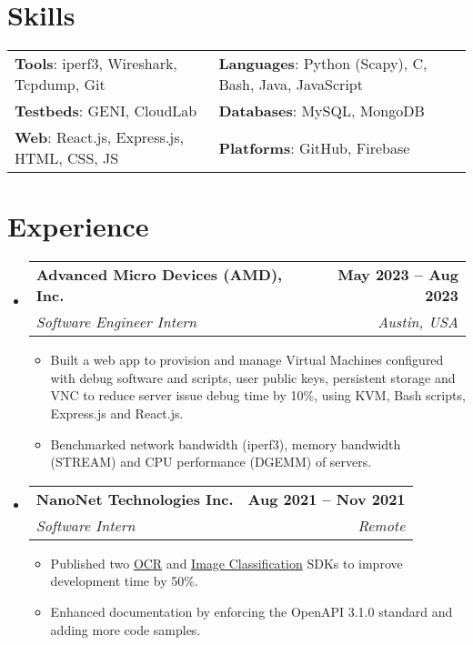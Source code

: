 \documentclass[letterpaper,11pt]{article}
\makeatletter
\newcommand{\resumeItem}[1]{
  \item\small{
    {#1 \vspace{-2pt}}
  }
}
\newcommand{\resumeSubheading}[4]{
  \vspace{-2pt}\item
    \begin{tabular*}{1.0\textwidth}[t]{l@{\extracolsep{\fill}}r}
      \vspace{-2pt}\textbf{#1} & \textbf{\small #2} \\
      \textit{\small#3} & \textit{\small #4} \\
    \end{tabular*}\vspace{-7pt}
}
\newcommand{\resumeSubHeadingListStart}{\begin{itemize}[leftmargin=0.0in, label={}]}
\newcommand{\resumeSubHeadingListEnd}{\end{itemize}}
\newcommand{\resumeItemListStart}{\begin{itemize}}
\newcommand{\resumeItemListEnd}{\end{itemize}\vspace{-5pt}}
\makeatother
\begin{document}
\section{Skills}
    \vspace{-2pt}
    \begin{itemize}[leftmargin=0.2in, label={}]
        {\item{
            \begin{tabular}{ l@{\hskip 0.2in} l }
                 \textbf{Tools}: iperf3, Wireshark, Tcpdump, Git & \textbf{Languages}: Python (Scapy), C, Bash, Java, JavaScript \\ 
                 \textbf{Testbeds}: GENI, CloudLab & \textbf{Databases}: MySQL, MongoDB \\  
                 \textbf{Web}: React.js, Express.js, HTML, CSS, JS & \textbf{Platforms}: GitHub, Firebase
            \end{tabular}
        }}
    \end{itemize}
\vspace{-20pt}


\section{Experience}
    \resumeSubHeadingListStart
        \resumeSubheading
            {Advanced Micro Devices (AMD), Inc.}{May 2023 -- Aug 2023}
            {Software Engineer Intern}{Austin, USA}
            \resumeItemListStart
                \resumeItem{Built a web app to provision and manage Virtual Machines configured with debug software and scripts, user public keys, persistent storage and VNC to reduce server issue debug time by 10\%, using KVM, Bash scripts, Express.js and React.js.}
                \resumeItem{Benchmarked network bandwidth (iperf3), memory bandwidth (STREAM) and CPU performance (DGEMM) of servers.}
            \resumeItemListEnd

        \resumeSubheading
            {NanoNet Technologies Inc.}{Aug 2021 -- Nov 2021}
            {Software Intern}{Remote}
            \resumeItemListStart
                \resumeItem{Published two \href{https://www.npmjs.com/package/@nanonets/optical-character-recognition}{OCR} and \href{https://www.npmjs.com/package/@nanonets/image-classification}{Image Classification} SDKs to improve development time by 50\%.}
                \resumeItem{Enhanced documentation by enforcing the OpenAPI 3.1.0 standard and adding more code samples.}
            \resumeItemListEnd
    \resumeSubHeadingListEnd
\vspace{-15pt}
\end{document}
